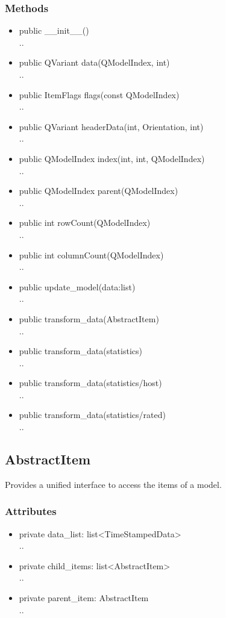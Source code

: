 \subsubsection{Methods}
\begin{itemize}
  \item public \_\_init\_\_()\\
  ..
  \item public QVariant data(QModelIndex, int)\\
  ..
  \item public ItemFlags flags(const QModelIndex)\\
  ..
  \item public QVariant headerData(int, Orientation, int)\\
  ..
  \item public QModelIndex index(int, int, QModelIndex)\\
  ..
  \item public QModelIndex parent(QModelIndex)\\
  ..
  \item public int rowCount(QModelIndex)\\
  ..
  \item public int columnCount(QModelIndex)\\
  ..
  \item public update\_model(data:list)\\
  ..
  \item public transform\_data(AbstractItem)\\
  ..
  \item public transform\_data(statistics)\\
  ..
  \item public transform\_data(statistics/host)\\
  ..
  \item public transform\_data(statistics/rated)\\
  ..
  \end{itemize}

\subsection{AbstractItem}
Provides a unified interface to access the items of a model.
\subsubsection{Attributes}
\begin{itemize}
  \item private data\_list: list<TimeStampedData>\\
  ..
  \item private child\_items: list<AbstractItem>\\
  ..
  \item private parent\_item: AbstractItem\\
  ..
\end{itemize}
